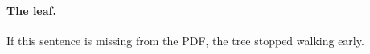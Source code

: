 \paragraph{The leaf.} If this sentence is missing from the PDF, the tree stopped walking early.
\label{deep:leaf}
